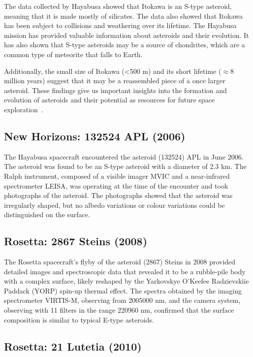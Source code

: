 The data collected by Hayabusa showed that Itokawa is an S-type asteroid, meaning that it is made mostly of silicates. The data also showed that Itokawa has been subject to collisions and weathering over its lifetime. The Hayabusa mission has provided valuable information about asteroids and their evolution. It has also shown that S-type asteroids may be a source of chondrites, which are a common type of meteorite that falls to Earth.

Additionally, the small size of Itokawa (<500 m) and its short lifetime (${\approx}$8 million years) suggest that it may be a reassembled piece of a once larger asteroid. These findings give us important insights into the formation and evolution of asteroids and their potential as resources for future space exploration~\cite{Clark2018}. 

\subsection{New Horizons: 132524 APL (2006)}

The Hayabusa spacecraft encountered the asteroid (132524) APL in June 2006. The asteroid was found to be an S-type asteroid with a diameter of 2.3 km. The Ralph instrument, composed of a visible imager \gls{MVIC} and a near-infrared spectrometer \gls{LEISA}, was operating at the time of the encounter and took photographs of the asteroid. The photographs showed that the asteroid was irregularly shaped, but no albedo variations or colour variations could be distinguished on the surface.

\subsection{Rosetta: 2867 Steins (2008)}

The Rosetta spacecraft's flyby of the asteroid (2867) Steins in 2008 provided detailed images and spectroscopic data that revealed it to be a rubble-pile body with a complex surface, likely reshaped by the Yarkovskye O'Keefee Radzievskiie Paddack (YORP) spin-up thermal effect. The spectra obtained by the imaging spectrometer VIRTIS-M, observing from 200{\textemdash}5000 nm, and the camera system, observing with 11 filters in the range 220{\textemdash}960 nm, conﬁrmed that the surface composition is similar to typical E-type asteroids.

\subsection{Rosetta: 21 Lutetia (2010)}

